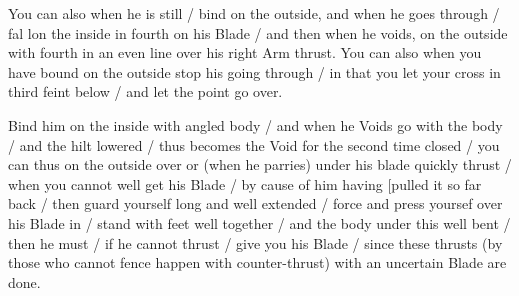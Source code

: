 \newpage


\newpage



You can also when he is still / bind on the outside, and when he goes
through / fal lon the inside in fourth on his Blade / and then when he
voids, on the outside with fourth in an even line over his right Arm
thrust. You can also when you have bound on the outside stop his going
through / in that you let your cross in third feint below / and
let the point go over.


Bind him on the inside with angled body / and when he Voids go with
the body / and the hilt lowered / thus becomes the Void for the second
time closed / you can thus on the outside over or (when he parries)
under his blade quickly thrust / when you cannot well get his Blade /
by cause of him having [pulled it so far back / then guard yourself
long and well extended / force and press yoursef over his Blade in /
stand with feet well together / and the body under this well bent /
then he must / if he cannot thrust / give you his Blade / since these
thrusts (by those who cannot fence happen with
counter-thrust) with an uncertain Blade are
done.

